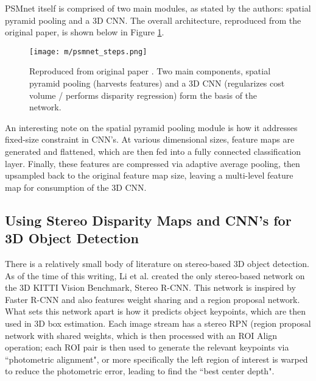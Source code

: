 PSMnet itself is comprised of two main modules, as stated by the authors: spatial pyramid pooling and a 3D CNN. The overall architecture, reproduced from the original paper, is shown below in Figure \ref{PsmGenSteps}. 

\begin{figure}[ht] %
    \centering
    \texttt{[image: m/psmnet\_steps.png]}
    \label{PsmGenSteps}
    \caption{Reproduced from original paper \cite{chang_pyramid_2018}. Two main components, spatial pyramid pooling (harvests features) and a 3D CNN (regularizes cost volume / performs disparity regression) form the basis of the network.}
\end{figure}

An interesting note on the spatial pyramid pooling module is how it addresses fixed-size constraint in CNN's. At various dimensional sizes, feature maps are generated and flattened, which are then fed into a fully connected classification layer. Finally, these features are compressed via adaptive average pooling, then upsampled back to the original feature map size, leaving a multi-level feature map for consumption of the 3D CNN.

\subsection{Using Stereo Disparity Maps and CNN's for 3D Object Detection}
%



There is a relatively small body of literature on stereo-based 3D object detection. As of the time of this writing, Li et al. \cite{li2019stereo} created the only stereo-based network on the 3D KITTI Vision Benchmark, Stereo R-CNN. This network is inspired by Faster R-CNN and also features weight sharing and a region proposal network. What sets this network apart is how it predicts object keypoints, which are then used in 3D box estimation. Each image stream has a stereo RPN (region proposal network with shared weights, which is then processed with an ROI Align operation; each ROI pair is then used to generate the relevant keypoints via ``photometric alignment", or more specifically the left region of interest is warped to reduce the photometric error, leading to find the ``best center depth".

